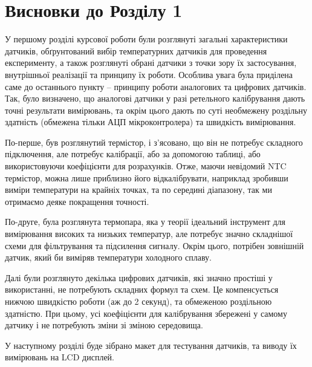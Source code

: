 \documentclass[a4paper,14pt]{extreport}
\begin{document}


% 
% 



\toc





\chapter*{Висновки до Розділу 1}

У першому розділі курсової роботи були розглянуті загальні характеристики датчиків, обґрунтований вибір температурних датчиків для проведення експерименту, а також розглянуті обрані датчики з точки зору їх застосування, внутрішньої реалізації та принципу їх роботи. Особлива увага була приділена саме до останнього пункту -- принципу роботи аналогових та цифрових датчиків. Так, було визначено, що аналогові датчики у разі ретельного калібрування дають точні результати вимірювань, та окрім цього дають по суті необмежену роздільну здатність (обмежена тільки АЦП мікроконтролера) та швидкість вимірювання. 

По-перше, був розглянутий термістор, і з'ясовано, що він не потребує складного підключення, але потребує калібрації, або за допомогою таблиці, або використовуючи коефіцієнти для розрахунків. Отже, маючи невідомий NTC термістор, можна лише приблизно його відкалібрувати, наприклад зробивши виміри температури на крайніх точках, та по середині діапазону, так ми отримаємо деяке покращення точності.

По-друге, була розглянута термопара, яка у теорії ідеальний інструмент для вимірювання високих та низьких температур, але потребує значно складнішої схеми для фільтрування та підсилення сигналу. Окрім цього, потрібен зовнішній датчик, який би виміряв температури холодного сплаву.

Далі були розглянуто декілька цифрових датчиків, які значно простіші у використанні, не потребують складних формул та схем. Це компенсується нижчою швидкістю роботи (аж до 2 секунд), та обмеженою роздільною здатністю. При цьому, усі коефіцієнти для калібрування збережені у самому датчику і не потребують зміни зі зміною середовища.

У наступному розділі буде зібрано макет для тестування датчиків, та виводу їх вимірювань на LCD дисплей.


\end{document}
